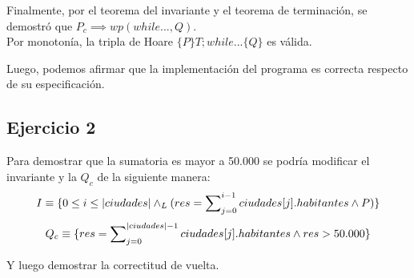 \documentclass[10pt,a4paper]{article}
\begin{document}
	Finalmente, por el teorema del invariante y el teorema de terminaci\'on, se demostr\'o que $P_{c} \implies wp(while..., Q)$.\\
	
	Por monoton\'ia, la tripla de Hoare $\{P\}T;while...\{Q\}$ es v\'alida.
	
	Luego, podemos afirmar que la implementaci\'on del programa es correcta respecto de su especificaci\'on.
	
	\subsection{Ejercicio 2}
Para demostrar que la sumatoria es mayor a 50.000 se podría modificar el invariante y la $Q_{c}$ de la siguiente manera: 
\begin{equation}
	I \equiv \{0 \le i \le |ciudades| \land _L (res = \sum\nolimits_{j=0}^{i - 1} ciudades[j].habitantes \land P)\}
\end{equation}
\begin{equation}
	Q_{c} \equiv  \{res = \sum\nolimits_{j=0}^{|ciudades| - 1} ciudades[j].habitantes \land res > 50.000\}\\
\end{equation}

Y luego demostrar la correctitud de vuelta.
\end{document}

